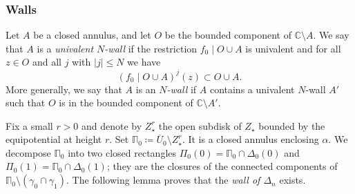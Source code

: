 \documentclass[]{amsart}
\newcommand{\bDelta}{{\mathbb{\Delta}}}
\newcommand{\bPi}{{\mathbb{\Pi}}}
\newcommand{\str}{{\star}}
\newcommand{\C}{\mathbb{C}}
\theoremstyle{remark}
\numberwithin{equation}{section}
\theoremstyle{definition}
\begin{document}
\subsubsection{Walls}
Let $A$ be a closed annulus, and let $O$ be the bounded component of $\C\setminus A$. We say that $A$ is a \emph{univalent $N$-wall} if the restriction  $f_0\mid  O\cup  A$ is univalent and for all $z\in O$ and all $j$ with $|j|\le N$ we have \[(f_0\mid  O\cup  A)^{j}(z)\subset O\cup A.\]
More generally, we say that $A$ is an \emph{$N$-wall} if $A$ contains a univalent $N$-wall $A'$ such that $O$ is in the bounded component of $\C\setminus A'$.




Fix a small $r>0$ and denote by $Z_\str^{ r}$ the open subdisk of $Z_\str$ bounded by the equipotential at height $r$. Set $\bPi_0\coloneqq \overline U_0\setminus Z^{r}_\str$. It is a closed annulus enclosing $\alpha$. We decompose $\bPi_0$ into two closed rectangles $\Pi_0(0)=\bPi_0\cap \Delta_0(0)$ and $\Pi_0(1)=\bPi_0\cap \Delta_0(1)$; they are the closures of the connected components of $\bPi_0\setminus (\gamma_0\cap \gamma_1)$. The following lemma proves that the \emph{wall of $\bDelta_n$} exists.
\end{document}
